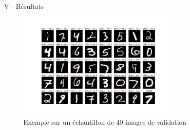 \documentclass[10pt]{beamer}
\begin{document}
\begin{frame}{V - Résultats}
\begin{figure}
	\centering
    \includegraphics[height=200px]{4-Resultat.jpg}
	\caption{Exemple sur un échantillon de 40 images de validation}
\end{figure}
\end{frame}
\end{document}
